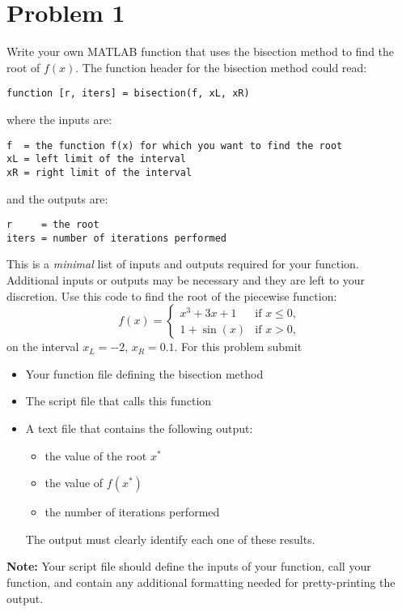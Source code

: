 \section{Problem 1}%
\label{sec:problem_1}
Write your own MATLAB function that uses the bisection method to find the root of $f(x)$. The function header for the bisection method could read:
\begin{lstlisting}[style=MATLAB,numbers=none]
function [r, iters] = bisection(f, xL, xR)
\end{lstlisting}
where the inputs are:
\begin{lstlisting}[style=Plain,numbers=none]
f  = the function f(x) for which you want to find the root
xL = left limit of the interval
xR = right limit of the interval
\end{lstlisting}
and the outputs are:
\begin{lstlisting}[style=Plain,numbers=none]
r     = the root
iters = number of iterations performed
\end{lstlisting}
This is a \emph{minimal} list of inputs and outputs required for your function. Additional inputs or outputs may be necessary and they are left to your discretion. Use this code to find the root of the piecewise function:
\begin{equation*}
  f(x) = \begin{cases}
    x^{3} + 3x + 1 & \text{if~} x \leq 0, \\
    1 + \sin(x)    & \text{if~} x > 0,
  \end{cases}
\end{equation*}
on the interval $x_{L} = -2$, $x_{R} = 0.1$. For this problem submit
\begin{itemize}
  \item Your function file defining the bisection method
  \item The script file that calls this function
  \item A text file that contains the following output:
    \begin{itemize}
      \item the value of the root $x^{*}$
      \item the value of $f(x^{*})$
      \item the number of iterations performed
    \end{itemize}
    The output must clearly identify each one of these results.
\end{itemize}
\textbf{Note:} Your script file should define the inputs of your function, call your function, and contain any additional formatting needed for pretty-printing the output.

